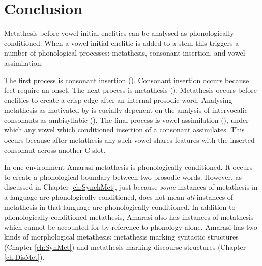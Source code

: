 \section{Conclusion}
Metathesis before vowel-initial enclitics can be
analysed as phonologically conditioned.
When a vowel-initial enclitic is added to a stem
this triggers a number of phonological processes: metathesis,
consonant insertion, and vowel assimilation.

The first process is consonant insertion ().
Consonant insertion occurs because feet require an onset.
The next process is metathesis ().
Metathesis occurs before enclitics to create a crisp edge after an internal prosodic word.
Analysing metathesis as motivated by  is cucially depenent
on the analysis of intervocalic consonants as ambisyllabic ().
The final process is vowel assimilation (),
under which any vowel which conditioned insertion of a consonant assimilates.
This occurs because after metathesis any such vowel shares
features with the inserted consonant across another C-slot.

In one environment Amarasi metathesis is phonologically conditioned.
It occurs to create a phonological boundary between two prosodic words.
However, as discussed in Chapter \ref{ch:SynchMet},
just because \emph{some} instances of metathesis in a language
are phonologically conditioned, does not mean \emph{all}
instances of metathesis in that language are phonologically conditioned.
In addition to phonologically conditioned metathesis,
Amarasi also has instances of metathesis which
cannot be accounted for by reference to phonology alone.
Amarasi has two kinds of morphological metathesis:
metathesis marking syntactic structures (Chapter \ref{ch:SynMet})
and metathesis marking discourse structures (Chapter \ref{ch:DisMet}).